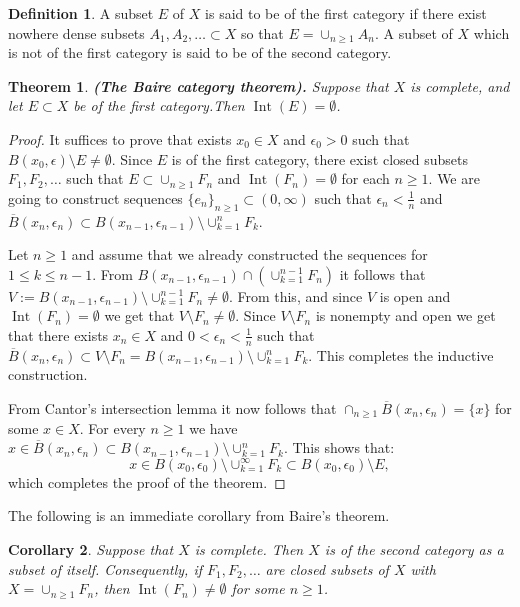 \documentclass[11pt,a4paper]{article}
\theoremstyle{definition}
\newtheorem{definition}{Definition}[section]
\theoremstyle{plain}
\newtheorem{theorem}{Theorem}[section]
\newtheorem{corollary}[theorem]{Corollary}
\DeclareMathOperator{\Int}{Int}
\renewcommand{\tt}[1]{\textnormal{\textbf{(#1).}}} %
\begin{document}
	\begin{definition}
		A subset $E$ of $X$ is said to be of the first category if there exist
		nowhere dense subsets $A_1,A_2,\dots \subset X$ so that 
		$E = \cup_{n \geq 1}{A_n}$. A subset of $X$ which is not of the first 
		category is said to be of the second category.
	\end{definition}
	\begin{theorem}
		\tt{The Baire category theorem}
		Suppose that $X$ is complete, and let $E \subset X$ be of the first
		category.Then $\Int(E) = \emptyset$.
	\end{theorem}
	\begin{proof}
		It suffices to prove that exists $x_0 \in X$ and $\epsilon_0 > 0$ such
		that $B(x_0,\epsilon) \setminus E \neq \emptyset$. Since $E$ is of
		the first category, there exist closed subsets $F_1,F_2,\dots$ such that
		$E \subset \cup_{n \geq 1}{F_n}$ and $\Int(F_n) = \emptyset$ for each
		$n \geq 1$. We are going to construct sequences 
		$\{e_n\}_{n \geq 1} \subset (0,\infty)$ such that 
		$\epsilon_n < \frac{1}{n}$ and $\overline{B}(x_n,\epsilon_n) \subset
		B(x_{n-1},\epsilon_{n-1}) \setminus \cup_{k=1}^{n}{F_k}$. 
		
		Let $n \geq 1$ and assume that we already constructed the sequences
		for $1 \le k \le n-1$. From 
		$B(x_{n-1},\epsilon_{n-1}) \cap (\cup_{k=1}^{n-1}{F_n})$ it follows that 	
		$V:=B(x_{n-1},\epsilon_{n-1}) \setminus \cup_{k=1}^{n-1}{F_n} 
		\neq \emptyset$. From this, and since $V$ is open and 
		$\Int(F_n) = \emptyset$ we get that $V \setminus F_n \neq \emptyset$.
		Since $V \setminus F_n$ is nonempty and open we get that there exists
		$x_n \in X$ and $0 < \epsilon_n < \frac{1}{n}$ such that
		$\overline{B}(x_n,\epsilon_n) \subset V \setminus F_n = 
		B(x_{n-1},\epsilon_{n-1}) \setminus \cup_{k=1}^{n}{F_k}$.
		This completes the inductive construction.
		
		From Cantor's intersection lemma it now follows that
		$\cap_{n \geq 1}{\overline{B}(x_n,\epsilon_n)} = \{x\}$ for some
		$x \in X$. For every $n \geq 1$ we have 
		$x \in \overline{B}(x_n,\epsilon_n) \subset 
		B(x_{n-1},\epsilon_{n-1}) \setminus \cup_{k=1}^{n}{F_k}$. This
		shows that:
		\[
			x \in B(x_{0},\epsilon_{0}) \setminus \cup_{k=1}^{\infty}{F_k}
			\subset B(x_0,\epsilon_0) \setminus E,
		\]
		which completes the proof of the theorem.
	\end{proof}
	The following is an immediate corollary from Baire's theorem.
	\begin{corollary}
		Suppose that $X$ is complete. Then $X$ is of the second category as a
		subset of itself. Consequently, if $F_1,F_2,\dots$ are closed subsets 
		of $X$ with $X = \cup_{n \geq 1}{F_n}$, then $\Int(F_n) \neq \emptyset$ 
		for some $n \geq 1$.
	\end{corollary}
\end{document}
